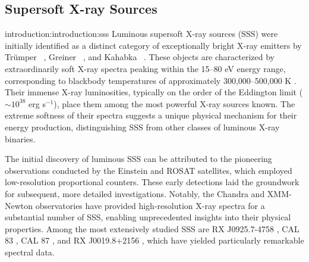         \subsection{Supersoft X-ray Sources} {introduction:introduction:sss}
        	Luminous supersoft X-ray sources (SSS) were initially identified as a distinct category of exceptionally bright X-ray emitters by Tr{\"u}mper \etal\ \cite{trumper1991x}, Greiner \etal\ \cite{greiner1991rosat}, and Kahabka \etal\ \cite{kahabka06}. These objects are characterized by extraordinarily soft X-ray spectra peaking within the 15--80 eV energy range, corresponding to blackbody temperatures of approximately 300,000--500,000 K \cite{kahabka06}. Their immense X-ray luminosities, typically on the order of the Eddington limit ($\sim 10^{38}$ erg s$^{-1}$), place them among the most powerful X-ray sources known. The extreme softness of their spectra suggests a unique physical mechanism for their energy production, distinguishing SSS from other classes of luminous X-ray binaries.
        	
        	The initial discovery of luminous SSS can be attributed to the pioneering observations conducted by the Einstein and ROSAT satellites, which employed low-resolution proportional counters. These early detections laid the groundwork for subsequent, more detailed investigations. Notably, the Chandra and XMM-Newton observatories have provided high-resolution X-ray spectra for a substantial number of SSS, enabling unprecedented insights into their physical properties. Among the most extensively studied SSS are RX J0925.7-4758 \cite{beardaChandra2002AA,motchXmmNewton2002AA}, CAL 83 \cite{lanz2005}, CAL 87 \cite{orio2004}, and RX J0019.8+2156 \cite{schwarz2004}, which have yielded particularly remarkable spectral data.
        	
